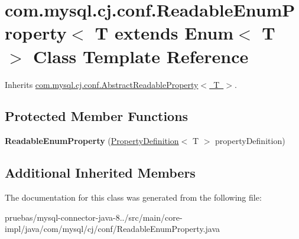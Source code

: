 \hypertarget{classcom_1_1mysql_1_1cj_1_1conf_1_1_readable_enum_property}{}\section{com.\+mysql.\+cj.\+conf.\+Readable\+Enum\+Property$<$ T extends Enum$<$ T $>$ Class Template Reference}
\label{classcom_1_1mysql_1_1cj_1_1conf_1_1_readable_enum_property}


Inherits \mbox{\hyperlink{classcom_1_1mysql_1_1cj_1_1conf_1_1_abstract_readable_property}{com.\+mysql.\+cj.\+conf.\+Abstract\+Readable\+Property$<$ T $>$}}.

\subsection*{Protected Member Functions}
\begin{DoxyCompactItemize}
\item 
\mbox{\label{classcom_1_1mysql_1_1cj_1_1conf_1_1_readable_enum_property_a9d8bf3b3415365c7d36f49ddb55040cd}} 
{\bfseries Readable\+Enum\+Property} (\mbox{\hyperlink{interfacecom_1_1mysql_1_1cj_1_1conf_1_1_property_definition}{Property\+Definition}}$<$ T $>$ property\+Definition)
\end{DoxyCompactItemize}
\subsection*{Additional Inherited Members}


The documentation for this class was generated from the following file\+:\begin{DoxyCompactItemize}
\item 
pruebas/mysql-\/connector-\/java-\/8../src/main/core-\/impl/java/com/mysql/cj/conf/Readable\+Enum\+Property.\+java\end{DoxyCompactItemize}
